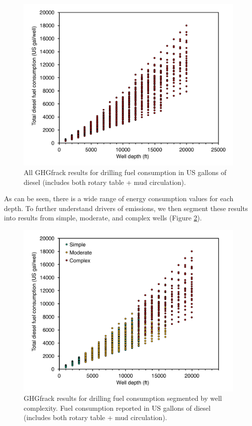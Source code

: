 \documentclass[11pt]{report}
\begin{document}
\begin{figure}[tb]
\includegraphics[width=0.8\columnwidth]{images/Drilling1.pdf}
\caption{All GHGfrack results for drilling fuel consumption in US gallons of diesel (includes both rotary table + mud circulation).}
\label{fig:drilling1}
\end{figure}

As can be seen, there is a wide range of energy consumption values for each depth.  To further understand drivers of emissions, we then segment these results into results from simple, moderate, and complex wells (Figure \ref{fig:drilling2}).

\begin{figure}[tb]
\includegraphics[width=0.8\columnwidth]{images/Drilling2.pdf}
\caption{GHGfrack results for drilling fuel consumption segmented by well complexity. Fuel consumption reported in US gallons of diesel (includes both rotary table + mud circulation).}
\label{fig:drilling2}
\end{figure}
\end{document}
